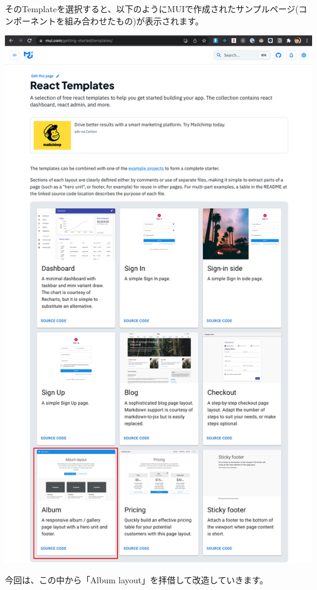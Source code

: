 そのTemplateを選択すると、以下のようにMUIで作成されたサンプルページ(コンポーネントを組み合わせたもの)が表示されます。

\begin{reviewimage}[H]%
\includegraphics[width=0.7\maxwidth]{./images/03-todo-with-react/mui004-templates.png}%
\label{image:03-todo-with-react:mui004-templates}
\end{reviewimage}

\clearpage


今回は、この中から「Album layout」を拝借して改造していきます。

